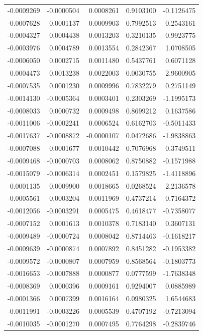 \documentclass[]{tufte-handout}
\begin{document}
\begin{longtable}[]{@{}rrrrr@{}}
-0.0009269 & -0.0000504 & 0.0008261 & 0.9103100 & -0.1126475 \\
-0.0007628 & 0.0001137 & 0.0009903 & 0.7992513 & 0.2543161 \\
-0.0004327 & 0.0004438 & 0.0013203 & 0.3210135 & 0.9923775 \\
-0.0003976 & 0.0004789 & 0.0013554 & 0.2842367 & 1.0708505 \\
-0.0006050 & 0.0002715 & 0.0011480 & 0.5437761 & 0.6071128 \\
0.0004473 & 0.0013238 & 0.0022003 & 0.0030755 & 2.9600905 \\
-0.0007535 & 0.0001230 & 0.0009996 & 0.7832279 & 0.2751149 \\
-0.0014130 & -0.0005364 & 0.0003401 & 0.2303269 & -1.1995173 \\
-0.0008033 & 0.0000732 & 0.0009498 & 0.8699212 & 0.1637586 \\
-0.0011006 & -0.0002241 & 0.0006524 & 0.6162703 & -0.5011433 \\
-0.0017637 & -0.0008872 & -0.0000107 & 0.0472686 & -1.9838863 \\
-0.0007088 & 0.0001677 & 0.0010442 & 0.7076968 & 0.3749511 \\
-0.0009468 & -0.0000703 & 0.0008062 & 0.8750882 & -0.1571988 \\
-0.0015079 & -0.0006314 & 0.0002451 & 0.1579825 & -1.4118896 \\
0.0001135 & 0.0009900 & 0.0018665 & 0.0268524 & 2.2136578 \\
-0.0005561 & 0.0003204 & 0.0011969 & 0.4737214 & 0.7164372 \\
-0.0012056 & -0.0003291 & 0.0005475 & 0.4618477 & -0.7358077 \\
-0.0007152 & 0.0001613 & 0.0010378 & 0.7183140 & 0.3607131 \\
-0.0009489 & -0.0000724 & 0.0008042 & 0.8714463 & -0.1618217 \\
-0.0009639 & -0.0000874 & 0.0007892 & 0.8451282 & -0.1953382 \\
-0.0009572 & -0.0000807 & 0.0007959 & 0.8568564 & -0.1803773 \\
-0.0016653 & -0.0007888 & 0.0000877 & 0.0777599 & -1.7638348 \\
-0.0008369 & 0.0000396 & 0.0009161 & 0.9294007 & 0.0885989 \\
-0.0001366 & 0.0007399 & 0.0016164 & 0.0980325 & 1.6544683 \\
-0.0011991 & -0.0003226 & 0.0005539 & 0.4707192 & -0.7213094 \\
-0.0010035 & -0.0001270 & 0.0007495 & 0.7764298 & -0.2839746 \\

\end{longtable}
\end{document}
